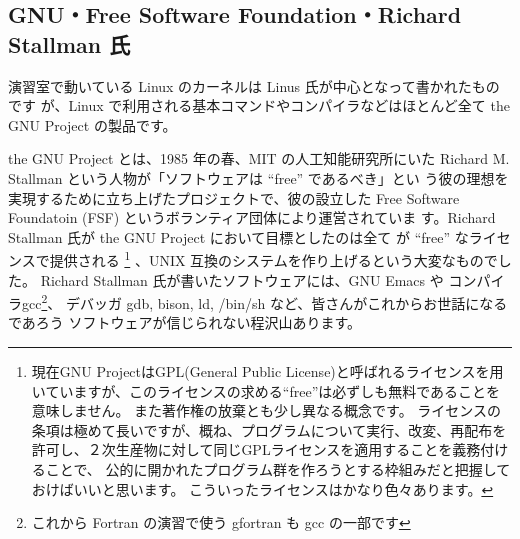 \documentclass[platex]{jsarticle}
\begin{document}
 \subsection{GNU・Free Software Foundation・Richard Stallman 氏}
 演習室で動いている Linux のカーネルは Linus 氏が中心となって書かれたものです
 が、Linux で利用される基本コマンドやコンパイラなどはほとんど全て the GNU
 Project の製品です。

 the GNU Project とは、1985 年の春、MIT の人工知能研究所にいた Richard
 M. Stallman という人物が「ソフトウェアは ``free'' であるべき」とい
 う彼の理想を実現するために立ち上げたプロジェクトで、彼の設立した Free
 Software Foundatoin (FSF) というボランティア団体により運営されていま
 す。Richard Stallman 氏が the GNU Project において目標としたのは全て
 が ``free'' なライセンスで提供される
 \footnote{ 現在GNU ProjectはGPL(General Public License)と呼ばれるライセンスを用いていますが、このライセンスの求める``free''は必ずしも無料であることを意味しません。
 また著作権の放棄とも少し異なる概念です。
 ライセンスの条項は極めて長いですが、概ね、プログラムについて実行、改変、再配布を許可し、２次生産物に対して同じGPLライセンスを適用することを義務付けることで、
 公的に開かれたプログラム群を作ろうとする枠組みだと把握しておけばいいと思います。
 こういったライセンスはかなり色々あります。}
 、UNIX 互換のシステムを作り上げるという大変なものでした。
 Richard Stallman 氏が書いたソフトウェアには、GNU Emacs や
 コンパイラgcc\footnote{ これから Fortran の演習で使う gfortran も gcc の一部です}、
 デバッガ gdb, bison, ld, /bin/sh など、皆さんがこれからお世話になるであろう
 ソフトウェアが信じられない程沢山あります。


%
\end{document}
